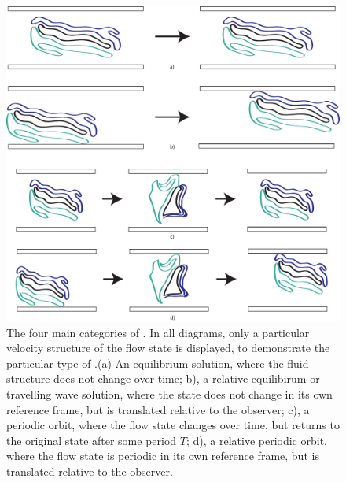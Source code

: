 \begin{figure}[ht!]
\centerline{\includegraphics[scale=0.5]{Figs/ECSClassification}}
\caption{The four main categories of \ecs. In all diagrams, only a particular velocity structure of the flow state is displayed, to demonstrate the particular type of \ecs.(a) An {equilibrium} solution, where the fluid structure does not change over time; b), a {relative equilibirum} or {travelling wave} solution, where the state does not change in its own reference frame, but is translated relative to the observer; c), a {periodic orbit}, where the flow state changes over time, but returns to the original state after some period $T$; d), a {relative periodic orbit}, where the flow state is periodic in its own reference frame, but is translated relative to the observer.}\label{fig:ECS}
\end{figure}


